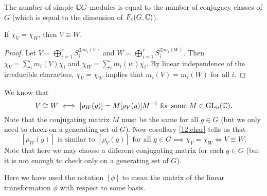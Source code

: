 \begin{cor}
	The number of simple $\mathbb{C} G$-modules is equal to the number of conjugacy classes of $G$ (which is equal to the dimension of $F_c(G,\mathbb{C})$).
\end{cor}

\begin{cor}\label{12:char}
	If $\chi_V=\chi_W$, then $V \cong W$.
\end{cor}

\begin{proof}
	Let $V = \bigoplus_{i=1}^r S_i^{\oplus m_i(V)}$ and $W = \bigoplus_{i=1}^r S_i^{\oplus m_i(W)}$.
	Then $\chi_V = \sum_i m_i(V)\chi_i$ and $\chi_W = \sum_i m_i(w)\chi_i$.
	By linear independence of the irreducible characters, $\chi_V=\chi_W$ implies that $m_i(V)=m_i(W)$ for all $i$.
\end{proof}

\begin{rmk}
	We know that
	\[V \cong W \iff [\rho_W(g)] = M[\rho_V(g)]M^{-1} \text{ for some } M \in \operatorname{GL}_n(\mathbb{C}).\]
	Note that the conjugating matrix $M$ must be the same for all $g \in G$ (but we only need to check on a generating set of $G$).
	Now corollary \ref{12:char} tells us that
	\[[\rho_W(g)] \text{ is similar to } [\rho_V(g)] \text{ for all } g \in G \implies \chi_V =\chi_W \iff V \cong W.\]
	Note that here we may choose a different conjugating matrix for each $g \in G$ (but it is not enough to check only on a generating set of $G$).
	
	Here we have used the notation $[\phi]$ to mean the matrix of the linear transformation $\phi$ with respect to some basis.
\end{rmk}
